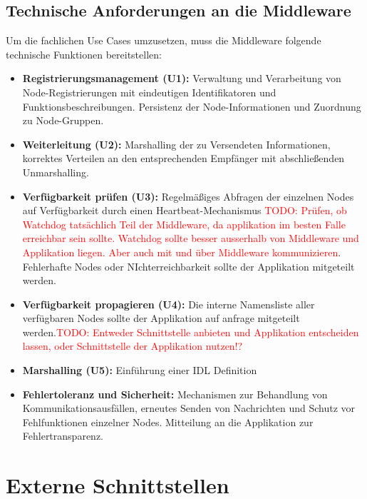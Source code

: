 \subsection{Technische Anforderungen an die Middleware}

Um die fachlichen Use Cases umzusetzen, muss die Middleware folgende technische Funktionen bereitstellen:

\begin{itemize}
	\item \textbf{Registrierungsmanagement (U1):}  
	Verwaltung und Verarbeitung von Node-Registrierungen mit eindeutigen Identifikatoren und Funktionsbeschreibungen.  
	Persistenz der Node-Informationen und Zuordnung zu Node-Gruppen.
	
	\item \textbf{Weiterleitung (U2):}  
	Marshalling der zu Versendeten Informationen, korrektes Verteilen an den entsprechenden Empfänger mit abschließenden Unmarshalling.
	
	\item \textbf{Verfügbarkeit prüfen (U3):}  
	Regelmäßiges Abfragen der einzelnen Nodes auf Verfügbarkeit durch einen Heartbeat-Mechanismus \textcolor{red}{TODO: Prüfen, ob Watchdog tatsächlich Teil der Middleware, da applikation im besten Falle erreichbar sein sollte. Watchdog sollte besser ausserhalb von Middleware und Applikation liegen. Aber auch mit und über Middleware kommunizieren}. Fehlerhafte Nodes oder NIchterreichbarkeit sollte der Applikation mitgeteilt werden.
	
	\item \textbf{Verfügbarkeit propagieren (U4):}  
	Die interne Namensliste aller verfügbaren Nodes sollte der Applikation auf anfrage mitgeteilt werden.\textcolor{red}{TODO: Entweder Schnittstelle anbieten und Applikation entscheiden lassen, oder Schnittstelle der Applikation nutzen!?}
	\item \textbf{Marshalling (U5):}  
	Einführung einer IDL Definition
	
	\item \textbf{Fehlertoleranz und Sicherheit:}  
	Mechanismen zur Behandlung von Kommunikationsausfällen, erneutes Senden von Nachrichten und Schutz vor Fehlfunktionen einzelner Nodes. Mitteilung an die Applikation zur Fehlertransparenz.
\end{itemize}

\section{Externe Schnittstellen}

